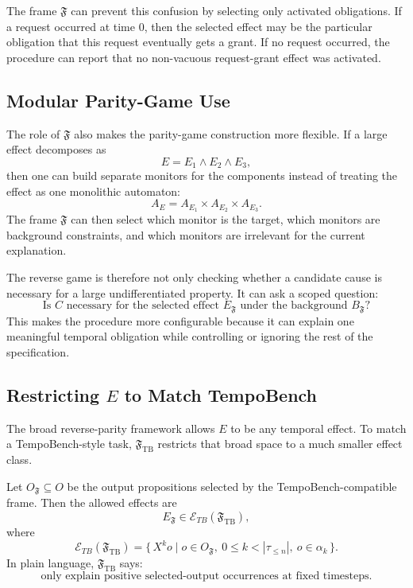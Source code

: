 \documentclass[11pt]{article}
\theoremstyle{remark}
\newcommand{\Frame}{\mathfrak{F}}
\begin{document}
The frame \(\Frame\) can prevent this confusion by selecting only activated
obligations. If a request occurred at time \(0\), then the selected effect may
be the particular obligation that this request eventually gets a grant. If no
request occurred, the procedure can report that no non-vacuous request-grant
effect was activated.

\subsection{Modular Parity-Game Use}

The role of \(\Frame\) also makes the parity-game construction more flexible.
If a large effect decomposes as
\[
  E=E_1\land E_2\land E_3,
\]
then one can build separate monitors for the components instead of treating the
effect as one monolithic automaton:
\[
  A_E = A_{E_1}\times A_{E_2}\times A_{E_3}.
\]
The frame \(\Frame\) can then select which monitor is the target, which
monitors are background constraints, and which monitors are irrelevant for the
current explanation.

The reverse game is therefore not only checking whether a candidate cause is
necessary for a large undifferentiated property. It can ask a scoped question:
\[
  \text{Is } C \text{ necessary for the selected effect } E_{\Frame}
  \text{ under the background } B_{\Frame}?
\]
This makes the procedure more configurable because it can explain one meaningful
temporal obligation while controlling or ignoring the rest of the specification.

\subsection{Restricting \texorpdfstring{\(E\)}{E} to Match TempoBench}

The broad reverse-parity framework allows \(E\) to be any temporal effect. To
match a TempoBench-style task, \(\Frame_{\mathrm{TB}}\) restricts that broad
space to a much smaller effect class.

Let \(O_{\Frame}\subseteq O\) be the output propositions selected by the
TempoBench-compatible frame. Then the allowed effects are
\[
  E_{\Frame} \in \mathcal{E}_{TB}(\Frame_{\mathrm{TB}}),
\]
where
\[
  \mathcal{E}_{TB}(\Frame_{\mathrm{TB}})
  =
  \{\,X^k o \mid
  o\in O_{\Frame},\ 0\leq k<|\tau_{\le n}|,\ 
  o\in\alpha_k\,\}.
\]
In plain language, \(\Frame_{\mathrm{TB}}\) says:
\[
  \text{only explain positive selected-output occurrences at fixed timesteps.}
\]
\end{document}
